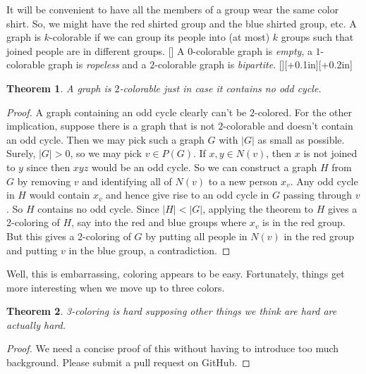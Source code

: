 \documentclass{amsbook}
\newcommand{\aaside}[2]{\marginnote{\scriptsize{#1}}[#2]}
\theoremstyle{plain}
\newtheorem{theorem}{Theorem}
\numberwithin{equation}{chapter}
\newcommand{\card}[1]{\left|#1\right|}
\begin{document}
It will be convenient to have all the members of a group wear the same color shirt.  So, we might have the red shirted group and the blue shirted group, etc.
A graph is $k$-colorable if we can group its people into (at most) $k$ groups such that joined people are in different groups. \aaside{$k$-colorable}{}
A $0$-colorable graph is \emph{empty}, a $1$-colorable graph is \emph{ropeless} and a $2$-colorable graph is \emph{bipartite}. \aaside{empty}{}\aaside{ropeless}{+0.1in}\aaside{bipartite}{+0.2in}
\begin{theorem}\label{TwoColoring}
A graph is $2$-colorable just in case it contains no odd cycle.
\end{theorem}
\begin{proof}
A graph containing an odd cycle clearly can't be $2$-colored.  For the other implication, suppose
there is a graph that is not $2$-colorable and doesn't contain an odd cycle.  Then we may pick such a graph $G$ with $\card{G}$ as small as possible.
Surely, $|G| > 0$, so we may pick $v \in P(G)$.  If $x, y \in N(v)$, then $x$ is not joined to $y$ since then $xyz$ would be an odd cycle.
So we can construct a graph $H$ from $G$ by removing $v$ and identifying all of $N(v)$ to a new person $x_v$.  Any odd cycle
in $H$ would contain $x_v$ and hence give rise to an odd cycle in $G$ passing through $v$.  So $H$ contains no odd cycle. Since $|H| < |G|$, 
applying the theorem to $H$ gives a 2-coloring of $H$, say into the red and blue groups
where $x_v$ is in the red group.  But this gives a 2-coloring of $G$ by putting all people in $N(v)$ in the red group and putting $v$ in the blue group, a contradiction.
\end{proof}

Well, this is embarrassing, coloring appears to be easy.  Fortunately, things get more interesting when we move up to three colors.
\begin{theorem}
3-coloring is hard supposing other things we think are hard are actually hard.
\end{theorem}
\begin{proof}
We need a concise proof of this without having to introduce too much background.  Please submit a pull request on GitHub.
\end{proof}
\end{document}
